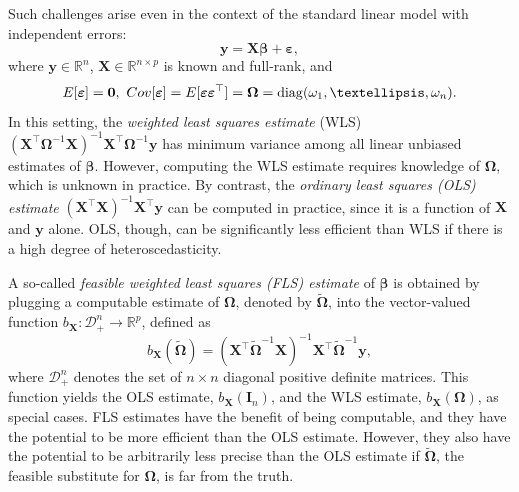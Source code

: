\documentclass[12pt]{article}
\newcommand{\Exp}[1]{{\rm{E}}[ #1 ]}
\newcommand{\Cov}[1]{{\rm{Cov}}[ #1 ]}
\newcommand{\bl}[1]{{\mathbf #1}}
\newcommand{\bs}[1]{\boldsymbol #1}
\begin{document}
Such challenges arise even in the context of the standard linear model with independent errors:
\begin{equation}\label{eq:smod}
    \bl{y} = \bl{X} \bs{\beta} + \bs{\varepsilon},
\end{equation}
where $\bl{y} \in \mathbb{R}^n$, $\bl{X} \in \mathbb{R}^{n \times p}$ is known and full-rank, and
\begin{equation*}
    \Exp{\bs{\varepsilon}} = \bl{0},~\Cov{\bs{\varepsilon}} = \Exp{\bs{\varepsilon} \bs{\varepsilon}^\top} = \bs{\Omega} = \mathrm{diag}(\omega_1, \dots, \omega_n).
\end{equation*}
In this setting, the \textit{weighted least squares estimate} (WLS) $(\bl{X}^\top \bs{\Omega}^{-1}\bl{X})^{-1} \bl{X}^\top \bs{\Omega}^{-1} \bl{y}$ has minimum variance among all linear unbiased estimates of $\bs{\beta}$. However, computing the WLS estimate requires knowledge of $\bs{\Omega}$, which is unknown in practice. By contrast, the \textit{ordinary least squares (OLS) estimate}  $(\bl{X}^\top \bl{X})^{-1} \bl{X}^\top \bl{y}$ can be computed in practice, since it is a function of $\bl{X}$ and $\bl{y}$ alone. OLS, though, can be significantly less efficient than WLS if there is a high degree of heteroscedasticity. 

A so-called \textit{feasible weighted least squares (FLS) estimate} of $\bs{\beta}$ is obtained by plugging a computable estimate of $\bs{\Omega}$, denoted by $\tilde{\bs{\Omega}}$, into the vector-valued function $b_{\bl{X}} : \mathcal{D}_+^{n} \rightarrow \mathbb{R}^p$, defined as
\begin{equation}\label{eq:gls_estimate}
    b_{\bl{X}}(\tilde{\bs{\Omega}}) = (\bl{X}^\top \tilde{\bl{\Omega}}^{-1} \bl{X})^{-1} \bl{X}^\top \tilde{\bl{\Omega}}^{-1} \bl{y},
\end{equation}
where $\mathcal{D}_+^n$ denotes the set of $n \times n$ diagonal positive definite matrices. This function yields the OLS estimate, $b_{\bl{X}}(\bl{I}_n)$, and the WLS estimate, $b_{\bl{X}}(\bs{\Omega})$, as special cases. FLS estimates have the benefit of being computable, and they have the potential to be more efficient than the OLS estimate. However, they also have the potential to be arbitrarily less precise than the OLS estimate if $\tilde{\bs{\Omega}}$, the feasible substitute for $\bs{\Omega}$, is far from the truth. 
\end{document}
